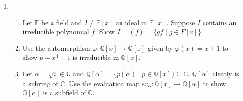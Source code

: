 \documentclass{article}
\newif\ifanswers
\begin{document}
\begin{enumerate}
\item
\begin{enumerate}[label = \alph*)]
	\item Let $\mathbb{F}$ be a field and $I \neq \mathbb{F}[x]$ an ideal in $\mathbb{F}[x]$.
	Suppose $I$ contains an irreducible polynomial $f$. Show 
	$I = (f) = \{gf \mid g \in F[x]\}$
	\item Use the automorphism $\varphi \colon \mathbb{Q}[x] \to \mathbb{Q}[x]$ given by 
	$\varphi(x) = x + 1$ to show $p = x^4 + 1$ is irreducible in $\mathbb{Q}[x]$.
	\item Let $\alpha = \sqrt{i} \in \mathbb{C}$ and $\mathbb{Q}[\alpha] = \{p(\alpha) \mid
	p \in \mathbb{Q}[x]\} \subseteq \mathbb{C}$. $\mathbb{Q}[\alpha]$ clearly is a subring
	of $\mathbb{C}$. Use the evaluation map $ev_{\alpha} \colon \mathbb{Q}[x] \to 
	\mathbb{Q}[\alpha]$ to show $\mathbb{Q}[\alpha]$ is a subfield of $\mathbb{C}$.
\end{enumerate}
\ifanswers
\textbf{Solution:}
\begin{enumerate}[label=\alph*)]
	\item Since $I$ contains $f$, it follows that $(f) \subseteq I$. Now because $f$ is 
	irreducible over $\mathbb{F}[x]$, it follows that $(f)$ is a maximal ideal, call it $J$.
	By the maximality of $J$, we have for any ideal $K$ containing $J$ that $K = J$ or
	$K = \mathbb{F}[x]$. Note that $I$ is an ideal containing $J$ but $I \neq \mathbb{F}[x]$;
	this means that $I = J = (f)$.
	\item Observe that under the automorphism, we have that 
	\[ p(x+1) = (x+1)^4 + 1 = x^4 + 4x^3 + 6x^2 + 4x + 2\]
	Now by Eisenstein's Criterion, observe that the prime $2$ does not divide $1$, 
	but $2$ divides every other coefficient and $4$ does not divide the constant term; thus we
	conclude that $p(x+1)$ is irreducible in $\mathbb{Q}[x]$ and thus $p(x)$ is irreducible in 
	$\mathbb{Q}[x]$.
	\item Consider the kernel of the evaluation map: we have that Ker $ev_{\alpha} = \{p \in 
	\mathbb{Q}[x] \mid p(\alpha) = 0\}$. Observe that Ker $ev_{\alpha}$ contains $x^4 + 1$.
	As shown previously, this is an irreducible polynomial over $\mathbb{Q}$ and is thus 
	a maximal ideal of $\mathbb{Q}[x]$. Thus, it follows that $\mathbb{Q}[x]/\text
	{Ker $ev_{\alpha}$}$ is a field, but by the First Isomorphism Theorem we have that 
	this is isomorpic to $\mathbb{Q}[\alpha]$; since this is a subring of $\mathbb{C}$ that is
	also a field, it follows that it is a subfield.
\end{enumerate}
\fi



\end{enumerate}
\end{document}
